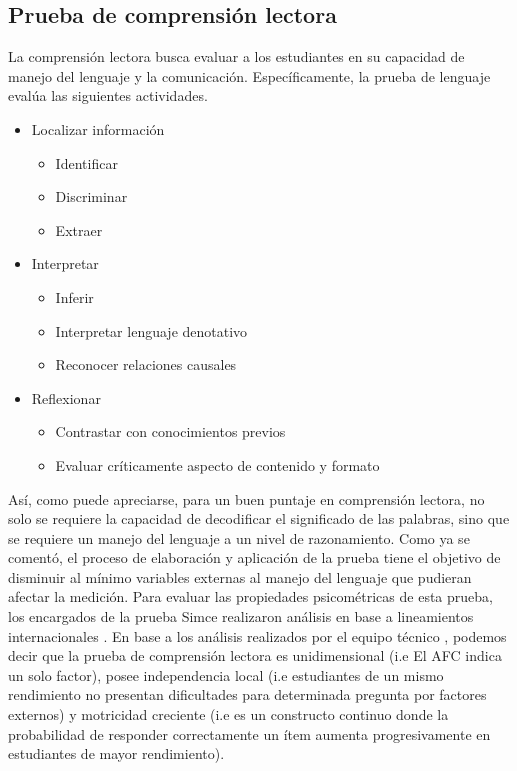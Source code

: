 \documentclass[12pt,twoside]{templates/facsothesis}
\providecommand{\tightlist}{%
  \setlength{\itemsep}{0pt}\setlength{\parskip}{0pt}}
\begin{document}
\hypertarget{prueba-de-comprensiuxf3n-lectora}{%
\subsection{Prueba de comprensión lectora}\label{prueba-de-comprensiuxf3n-lectora}}

La comprensión lectora busca evaluar a los estudiantes en su capacidad de manejo del lenguaje y la comunicación. Específicamente, la prueba de lenguaje evalúa las siguientes actividades.

\begin{itemize}
\tightlist
\item
  Localizar información

  \begin{itemize}
  \tightlist
  \item
    Identificar
  \item
    Discriminar
  \item
    Extraer
  \end{itemize}
\item
  Interpretar

  \begin{itemize}
  \tightlist
  \item
    Inferir
  \item
    Interpretar lenguaje denotativo
  \item
    Reconocer relaciones causales
  \end{itemize}
\item
  Reflexionar

  \begin{itemize}
  \tightlist
  \item
    Contrastar con conocimientos previos
  \item
    Evaluar críticamente aspecto de contenido y formato
  \end{itemize}
\end{itemize}

Así, como puede apreciarse, para un buen puntaje en comprensión lectora, no solo se requiere la capacidad de decodificar el significado de las palabras, sino que se requiere un manejo del lenguaje a un nivel de razonamiento. Como ya se comentó, el proceso de elaboración y aplicación de la prueba tiene el objetivo de disminuir al mínimo variables externas al manejo del lenguaje que pudieran afectar la medición. Para evaluar las propiedades psicométricas de esta prueba, los encargados de la prueba Simce realizaron análisis en base a lineamientos internacionales \citep{aera_Report_2011}. En base a los análisis realizados por el equipo técnico \citep{ace_Informe_2018}, podemos decir que la prueba de comprensión lectora es unidimensional (i.e El AFC indica un solo factor), posee independencia local (i.e estudiantes de un mismo rendimiento no presentan dificultades para determinada pregunta por factores externos) y motricidad creciente (i.e es un constructo continuo donde la probabilidad de responder correctamente un ítem aumenta progresivamente en estudiantes de mayor rendimiento).
\end{document}
